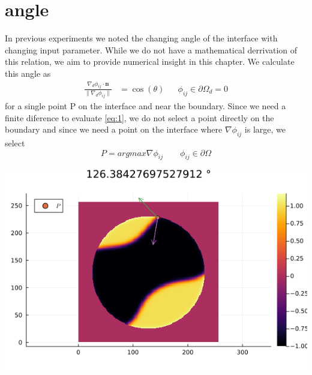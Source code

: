 \documentclass{mimosis}
\begin{document}
\chapter{angle}
\label{sec:org94cc9b4}
In previous experiments we noted the changing angle of the interface with changing input parameter. While we do not have a mathematical derrivation of this relation, we aim to provide numerical insight in this chapter. We calculate this angle as
\begin{align}
\label{eq:1}
\frac{\nabla_d \phi_{ij} \cdot \mathbf{n}}{\|\nabla_{d} \phi_{ij}\|} &= \cos(\theta)& & \phi_{ij} \in \partial\Omega_{d} = 0
\end{align}
for a single point P on the interface and near the boundary. Since we need a finite diference to evaluate \ref{eq:1}, we do not select a point directly on the boundary and since we need a point on the interface where \(\nabla \phi_{ij}\) is large, we select
\begin{equation}
\label{eq:2}
P = argmax \nabla \phi_{ij} \qquad \phi_{ij} \in \partial \Omega
\end{equation}
\begin{center}
\includegraphics[width=.9\linewidth]{images/angle.png}
\label{}
\end{center}
\end{document}
